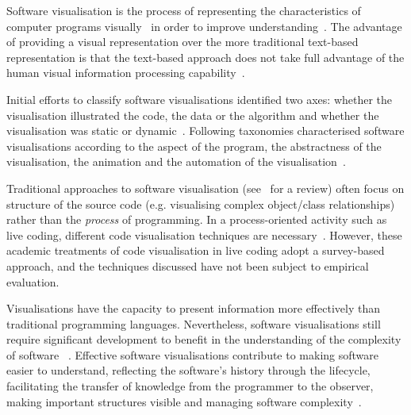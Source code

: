 Software visualisation is the process of representing the characteristics of computer programs visually~\cite{Stasko1992} in order to improve understanding~\cite{Diehl2007}. The advantage of providing a visual representation over the more traditional text-based representation is that the text-based approach does not take full advantage of the human visual information processing capability~\cite{Myers1989}.

Initial efforts to classify software visualisations identified two axes: whether the visualisation illustrated the code, the data or the algorithm and whether the visualisation was static or dynamic~\cite{Myers1989}. Following taxonomies characterised software visualisations according to the aspect of the program, the abstractness of the visualisation, the animation and the automation of the visualisation~\cite{Stasko1992}.

Traditional approaches to software visualisation (see~\cite{Novais2013} for a review) often focus on structure of the source code (e.g. visualising complex object/class relationships) rather than the \emph{process} of programming. In a process-oriented activity such as live coding, different code visualisation techniques are necessary~\cite{McLean2010a,Magnusson2013}. However, these academic treatments of code visualisation in live coding adopt a survey-based approach, and the techniques discussed have not been subject to empirical evaluation.

Visualisations have the capacity to present information more effectively than traditional programming languages. Nevertheless, software visualisations still require significant development to benefit in the understanding of the complexity of software ~\cite{Baecker1995}. Effective software visualisations contribute to making software easier to understand, reflecting the software's history through the lifecycle, facilitating the transfer of knowledge from the programmer to the observer, making important structures visible and managing software complexity~\cite{Baecker1995}.



